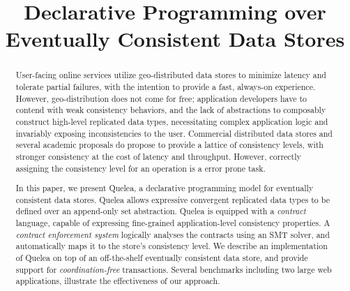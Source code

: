 \documentclass[pldi]{sigplanconf}
\begin{document}
%
%

\title{Declarative Programming over Eventually Consistent Data Stores }

\maketitle
\begin{abstract}
User-facing online services utilize geo-distributed data stores to minimize
latency and tolerate partial failures, with the intention to provide a fast,
always-on experience. However, geo-distribution does not come for free;
application developers have to contend with weak consistency behaviors, and the
lack of abstractions to composably construct high-level replicated data types,
necessitating complex application logic and invariably exposing inconsistencies
to the user. Commercial distributed data stores and several academic proposals
do propose to provide a lattice of consistency levels, with stronger
consistency at the cost of latency and throughput. However, correctly assigning
the consistency level for an operation is a error prone task.

In this paper, we present Quelea, a declarative programming model for
eventually consistent data stores. Quelea allows expressive convergent
replicated data types to be defined over an append-only set abstraction. Quelea
is equipped with a \emph{contract} language, capable of expressing fine-grained
application-level consistency properties. A \emph{contract enforcement system}
logically analyses the contracts using an SMT solver, and automatically maps it
to the store's consistency level. We describe an implementation of Quelea on
top of an off-the-shelf eventually consistent data store, and provide support
for \emph{coordination-free} transactions. Several benchmarks including two
large web applications, illustrate the effectiveness of our approach.
\end{abstract}




\end{document}
